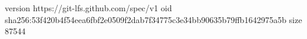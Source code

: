 version https://git-lfs.github.com/spec/v1
oid sha256:53f420b4f54eea6fbf2e0509f2dab7f34775c3e34bb90635b79ffb1642975a5b
size 87544
